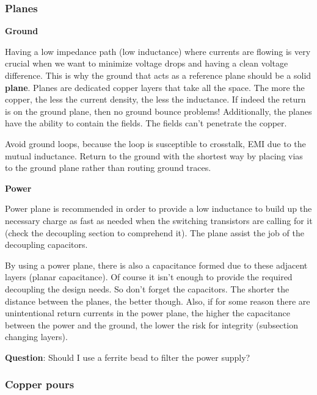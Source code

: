 \documentclass[12pt]{article}
\begin{document}
\subsubsection{Planes}

\textbf{Ground}

Having a low impedance path (low inductance) where currents are flowing is very crucial when we want to minimize voltage drops and having a clean voltage difference. This is why the ground that acts as a reference plane should be a solid \textbf{plane}. Planes are dedicated copper layers that take all the space. The more the copper, the less the current density, the less the inductance. If indeed the return is on the ground plane, then no ground bounce problems! Additionally, the planes have the ability to contain the fields. The fields can't penetrate the copper.

Avoid ground loops, because the loop is susceptible to crosstalk, EMI due to the mutual inductance. Return to the ground with the shortest way by placing vias to the ground plane rather than routing ground traces.

\textbf{Power}

Power plane is recommended in order to provide a low inductance to build up the necessary charge as fast as needed when the switching transistors are calling for it (check the decoupling section to comprehend it). The plane assist the job of the decoupling capacitors.

By using a power plane, there is also a capacitance formed due to these adjacent layers (planar capacitance). Of course it isn't enough to provide the required decoupling the design needs. So don't forget the capacitors. The shorter the distance between the planes, the better though. Also, if for some reason there are unintentional return currents in the power plane, the higher the capacitance between the power and the ground, the lower the risk for integrity (subsection changing layers).



\textbf{Question}: Should I use a ferrite bead to filter the power supply?

\subsubsection{Copper pours}
\end{document}
